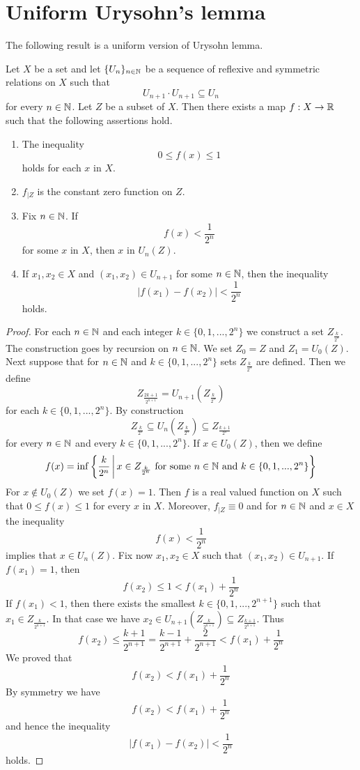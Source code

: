 \section{Uniform Urysohn's lemma}
\noindent
The following result is a uniform version of Urysohn lemma.

\begin{theorem}\label{theorem:uniform_Urysohn_lemma}
Let $X$ be a set and let $\{U_n\}_{n\in {\mathbb N}}$ be a sequence of reflexive and symmetric relations on $X$ such that
$$U_{n+1} \cdot U_{n+1} \subseteq U_n$$
for every $n \in {\mathbb N}$. Let $Z$ be a subset of $X$. Then there exists a map $f:X\rightarrow {\mathbb R}$ such that the following assertions hold.
\begin{enumerate}[label=\emph{\textbf{(\arabic*)}}, leftmargin=*]
\item The inequality
$$0 \leq f(x) \leq 1$$
holds for each $x$ in $X$.
\item $f_{\mid Z}$ is the constant zero function on $Z$.
\item Fix $n \in {\mathbb N}$. If 
$$f(x) < \frac{1}{2^n}$$
for some $x$ in $X$, then $x$ in $U_n(Z)$.
\item If $x_1,x_2 \in X$ and $(x_1,x_2) \in U_{n+1}$ for some $n \in {\mathbb N}$, then the inequality
$$|f(x_1) - f(x_2)| < \frac{1}{2^n}$$
holds.
\end{enumerate}
\end{theorem}
\begin{proof}
For each $n\in {\mathbb N}$ and each integer $k \in \{0,1,...,2^n\}$ we construct a set $Z_{\frac{k}{2^n}}$. The construction goes by recursion on $n\in {\mathbb N}$. We set $Z_0 = Z$ and $Z_1 = U_0(Z)$. Next suppose that for $n\in {\mathbb N}$ and $k\in \{0,1,...,2^n\}$ sets $Z_{\frac{k}{2^n}}$ are defined. Then we define
$$Z_{\frac{2k + 1}{2^{n+1}}} = U_{n+1}\left(Z_{\frac{k}{2^n}}\right)$$
for each $k \in \{0,1,...,2^{n}\}$. By construction
$$Z_{\frac{k}{2^n}} \subseteq U_n\left(Z_{\frac{k}{2^n}}\right) \subseteq Z_{\frac{k+1}{2^n}}$$
for every $n\in {\mathbb N}$ and every $k\in \{0,1,...,2^{n}\}$. If $x \in U_0(Z)$, then we define 
$$f(x) = \inf \bigg\{\frac{k}{2^n}\,\bigg|\,x\in Z_{\frac{k}{2^n}}\mbox{ for some }n\in {\mathbb N}\mbox{ and } k\in \{0,1,...,2^n\}\bigg\}
$$
For $x\not \in U_0(Z)$ we set $f(x) = 1$. Then $f$ is a real valued function on $X$ such that $0\leq f(x) \leq 1$ for every $x$ in $X$. Moreover, $f_{\mid Z} \equiv 0$ and for $n\in {\mathbb N}$ and $x \in X$ the inequality
$$f(x) < \frac{1}{2^n}$$
implies that $x \in U_n(Z)$. Fix now $x_1,x_2\in X$ such that $(x_1,x_2)\in U_{n+1}$. If $f(x_1) = 1$, then 
$$f(x_2) \leq 1 < f(x_1) + \frac{1}{2^n}$$
If $f(x_1) < 1$, then there exists the smallest $k\in \{0,1,...,2^{n+1}\}$ such that $x_1 \in Z_{\frac{k}{2^{n+1}}}$. In that case we have $x_2 \in U_{n+1}\left(Z_{\frac{k}{2^{n+1}}}\right) \subseteq Z_{\frac{k+1}{2^{n+1}}}$. Thus 
$$f(x_2) \leq \frac{k+1}{2^{n+1}} = \frac{k-1}{2^{n+1}} + \frac{2}{2^{n+1}} < f(x_1) + \frac{1}{2^n}$$
We proved that
$$f(x_2) < f(x_1) + \frac{1}{2^n}$$
By symmetry we have 
$$f(x_2) < f(x_1) + \frac{1}{2^n}$$
and hence the inequality
$$|f(x_1) - f(x_2)| < \frac{1}{2^n}$$
holds.
\end{proof}

